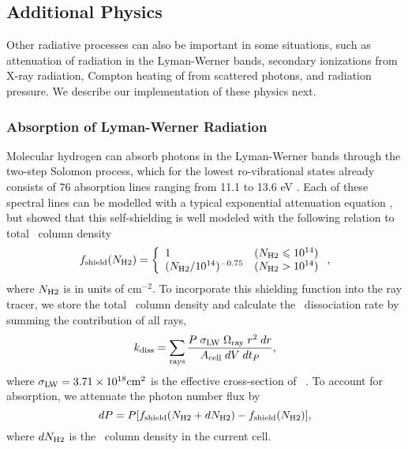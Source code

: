 \documentclass[useAMS,usenatbib,a4paper]{mn2e}
\begin{document}
\subsection{Additional Physics}
\label{sec:addphysics}

Other radiative processes can also be important in some situations,
such as attenuation of radiation in the Lyman-Werner bands, secondary
ionizations from X-ray radiation, Compton heating of from scattered
photons, and radiation pressure.  We describe our implementation of
these physics next.

\subsubsection{Absorption of Lyman-Werner Radiation}

Molecular hydrogen can absorb photons in the Lyman-Werner bands
through the two-step Solomon process, which for the lowest
ro-vibrational states already consists of 76 absorption lines ranging
from 11.1 to 13.6 eV \citep{Stecher67, Dalgarno70, Haiman00}.  Each of
these spectral lines can be modelled with a typical exponential
attenuation equation \citep{Ricotti01}, but \citet{Draine96} showed
that this self-shielding is well modeled with the following relation
to total \hh~column density
%
\begin{equation}
  \label{eqn:lwband}
  f_{\rm shield} (N_{\rm H2}) =
  \left\{ \begin{array}{l@{\quad}l}
      1 & (N_{\rm H2} \le 10^{14})\\
      (N_{\rm H2}/10^{14})^{-0.75} & (N_{\rm H2} >
      10^{14})
    \end{array} \right. ,
\end{equation}
where $N_{\rm H2}$ is in units of cm$^{-2}$.  To incorporate this
shielding function into the ray tracer, we store the total \hh~column
density and calculate the \hh~dissociation rate by summing the
contribution of all rays,
%
\begin{equation}
  \label{eqn:lwRT}
  k_{\rm diss} = \sum_{\rm rays} \frac{P \; \sigma_{\rm LW} \;
    \Omega_{\rm ray} \; r^2 \; dr}{A_{\rm cell} \; dV \; dt_P},
\end{equation}
where $\sigma_{\rm LW} = 3.71 \times 10^{18} \mathrm{cm}^2$ is the
effective cross-section of \hh~\citep{Abel97}.  To account for
absorption, we attenuate the photon number flux by
%
\begin{equation}
  \label{eqn:LWdP}
  dP = P [f_{\rm shield}(N_{\rm H2} + dN_{\rm H2}) - f_{\rm shield}(N_{\rm H2})],
\end{equation}
where $dN_{\rm H2}$ is the \hh~column density in the current cell.
\end{document}
